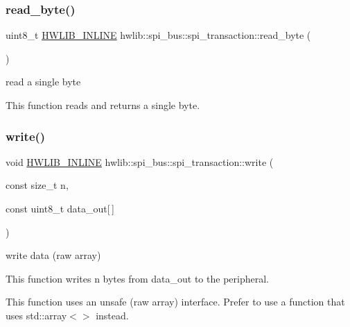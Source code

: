 \subsubsection{\texorpdfstring{read\+\_\+byte()}{read\_byte()}}
{\footnotesize\ttfamily uint8\+\_\+t \hyperlink{hwlib-defines_8hpp_a520a8905adc71f1757aea4ce05183585}{H\+W\+L\+I\+B\+\_\+\+I\+N\+L\+I\+NE} hwlib\+::spi\+\_\+bus\+::spi\+\_\+transaction\+::read\+\_\+byte (\begin{DoxyParamCaption}{ }\end{DoxyParamCaption})\hspace{0.3cm}{\ttfamily [inline]}}

read a single byte

This function reads and returns a single byte. \mbox{\label{classhwlib_1_1spi__bus_1_1spi__transaction_a53219b4fcfef256728024ef010c71bb8}} 
\subsubsection{\texorpdfstring{write()}{write()}\hspace{0.1cm}{\footnotesize\ttfamily [1/3]}}
{\footnotesize\ttfamily void \hyperlink{hwlib-defines_8hpp_a520a8905adc71f1757aea4ce05183585}{H\+W\+L\+I\+B\+\_\+\+I\+N\+L\+I\+NE} hwlib\+::spi\+\_\+bus\+::spi\+\_\+transaction\+::write (\begin{DoxyParamCaption}\item[{const size\+\_\+t}]{n,  }\item[{const uint8\+\_\+t}]{data\+\_\+out\mbox{[}$\,$\mbox{]} }\end{DoxyParamCaption})\hspace{0.3cm}{\ttfamily [inline]}}

write data (raw array)

This function writes n bytes from data\+\_\+out to the peripheral.

This function uses an unsafe (raw array) interface. Prefer to use a function that uses std\+::array$<$$>$ instead. \mbox{\label{classhwlib_1_1spi__bus_1_1spi__transaction_a2a877f3b53b777630f7ac1fe0dde4b43}} 
